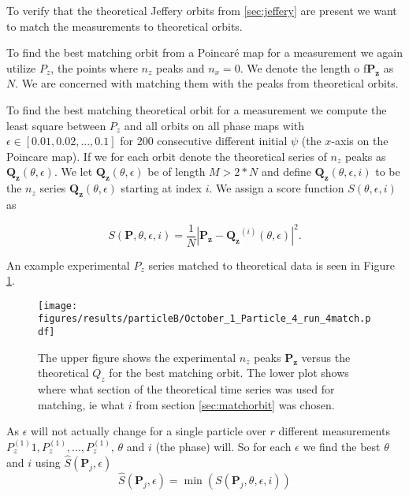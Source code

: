\label{sec:matchorbit}
To verify that the theoretical Jeffery orbits from \ref{sec:jeffery} are present we want to match the measurements to theoretical orbits.

To find the best matching orbit from a Poincaré map for a measurement we again utilize $P_z$, the points where $n_z$ peaks and $n_x=0$. We denote the length o f$\mathbf{P_z}$ as $N$. We are concerned with matching them with the peaks from theoretical orbits.


To find the best matching theoretical orbit for a measurement we compute the least square between $P_z$ and all orbits on all phase maps with $\epsilon \in [0.01, 0.02, ..., 0.1]$ for 200 consecutive different initial $\psi$ (the $x$-axis on the Poincare map). If we for each orbit denote the theoretical series of $n_z$ peaks as $\mathbf{Q_z}(\theta, \epsilon)$. We let $\mathbf{Q_z}(\theta, \epsilon)$ be of length $M > 2*N$ and define $\mathbf{Q_z}(\theta, \epsilon, i)$ to be the $n_z$ series $\mathbf{Q_z}(\theta, \epsilon)$ starting at index $i$. We assign a score function $S(\theta, \epsilon, i)$ as

\begin{equation}
S(\mathbf{P}, \theta, \epsilon, i) = \frac{1}{N}\left| \mathbf{P_z} - \mathbf{Q_z}^{(i)}(\theta, \epsilon) \right|^2.
\end{equation}

\noindent An example experimental $P_z$ series matched to theoretical data is seen in Figure \ref{fig:particleB2match}.

\begin{figure}[H]
\centering
\texttt{[image: figures/results/particleB/October\_1\_Particle\_4\_run\_4match.pdf]}
\caption{The upper figure shows the experimental $n_z$ peaks $\mathbf{P_z}$ versus the theoretical $Q_z$ for the best matching orbit. The lower plot shows where what section of the theoretical time series was used for matching, ie what $i$ from section \ref{sec:matchorbit} was chosen.}
\label{fig:particleB2match}
\end{figure}



\noindent As $\epsilon$ will not actually change for a single particle over $r$ different measurements $P_z^{(1)}1, P_z^{(1)}, ..., P_z^{(1)}$, $\theta$ and $i$ (the phase) will. So for each $\epsilon$ we find the best $\theta$ and $i$ using $\hat{S}(\mathbf{P}_j, \epsilon)$ 
\begin{equation}
\hat{S}(\mathbf{P}_j, \epsilon) =  \min(S(\mathbf{P}_j, \theta, \epsilon, i))
\end{equation}

